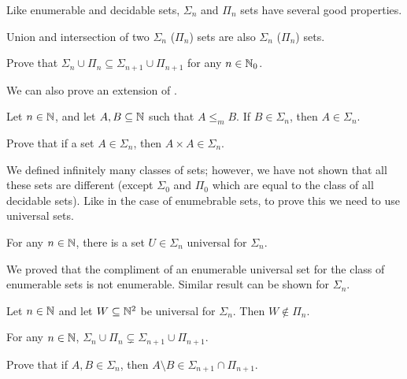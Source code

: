 Like enumerable and decidable sets, $\Sigma_n$ and $\Pi_n$ sets have several
good properties.
\begin{theorem}
  Union and intersection of two $\Sigma_n$ ($\Pi_n$) sets are also $\Sigma_n$
  ($\Pi_n$) sets.
\end{theorem}

\begin{exercise}
  Prove that $\Sigma_n \cup \Pi_n \subseteq \Sigma_{n + 1} \cup \Pi_{n + 1}$ for
  any $n \in {\mathbb{N}}_0$.
\end{exercise}

We can also prove an extension of
.
\begin{theorem}
  Let $n \in {\mathbb{N}}$, and let $A, B \subseteq {\mathbb{N}}$ such that $A \le_m B$.
  If $B \in \Sigma_n$, then $A \in \Sigma_n$.
\end{theorem}


\begin{exercise}
  Prove that if a set $A \in \Sigma_n$, then $A \times A \in \Sigma_n$.
\end{exercise}

We defined infinitely many classes of sets; however, we have not shown that all
these sets are different (except $\Sigma_0$ and $\Pi_0$ which are equal to the
class of all decidable sets). Like in the case of enumebrable sets, to prove
this we need to use universal sets.
\begin{theorem}
  For any $n \in {\mathbb{N}}$, there is a set $U \in \Sigma_n$ universal for $\Sigma_n$.
\end{theorem}

We proved that the compliment of an enumerable universal set for the class of
enumerable sets is not enumerable. Similar result can be shown for $\Sigma_n$.
\begin{theorem}
  Let $n \in {\mathbb{N}}$ and let $W \subseteq {\mathbb{N}}^2$ be universal for $\Sigma_n$. Then 
  $W \not\in \Pi_n$.
\end{theorem}

\begin{corollary}
  For any $n \in {\mathbb{N}}$, $\Sigma_n \cup \Pi_n \subsetneq 
    \Sigma_{n + 1} \cup \Pi_{n + 1}$.
\end{corollary}

\begin{chapterendexercises}
  \exercise Prove that if $A, B \in \Sigma_n$, then 
    $A \setminus B \in \Sigma_{n + 1} \cap \Pi_{n + 1}$.
\end{chapterendexercises}
